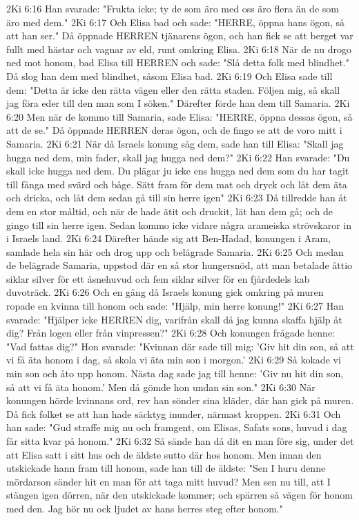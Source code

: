 2Ki 6:16  Han svarade: "Frukta icke; ty de som äro med oss äro flera än de som äro med dem."
2Ki 6:17  Och Elisa bad och sade: "HERRE, öppna hans ögon, så att han ser." Då öppnade HERREN tjänarens ögon, och han fick se att berget var fullt med hästar och vagnar av eld, runt omkring Elisa.
2Ki 6:18  När de nu drogo ned mot honom, bad Elisa till HERREN och sade: "Slå detta folk med blindhet." Då slog han dem med blindhet, såsom Elisa bad.
2Ki 6:19  Och Elisa sade till dem: "Detta är icke den rätta vägen eller den rätta staden. Följen mig, så skall jag föra eder till den man som I söken." Därefter förde han dem till Samaria.
2Ki 6:20  Men när de kommo till Samaria, sade Elisa: "HERRE, öppna dessas ögon, så att de se." Då öppnade HERREN deras ögon, och de fingo se att de voro mitt i Samaria.
2Ki 6:21  När då Israels konung såg dem, sade han till Elisa: "Skall jag hugga ned dem, min fader, skall jag hugga ned dem?"
2Ki 6:22  Han svarade: "Du skall icke hugga ned dem. Du plägar ju icke ens hugga ned dem som du har tagit till fånga med svärd och båge. Sätt fram för dem mat och dryck och låt dem äta och dricka, och låt dem sedan gå till sin herre igen"
2Ki 6:23  Då tillredde han åt dem en stor måltid, och när de hade ätit och druckit, lät han dem gå; och de gingo till sin herre igen. Sedan kommo icke vidare några arameiska strövskaror in i Israels land.
2Ki 6:24  Därefter hände sig att Ben-Hadad, konungen i Aram, samlade hela sin här och drog upp och belägrade Samaria.
2Ki 6:25  Och medan de belägrade Samaria, uppstod där en så stor hungersnöd, att man betalade åttio siklar silver för ett åsnehuvud och fem siklar silver för en fjärdedels kab duvoträck.
2Ki 6:26  Och en gång då Israels konung gick omkring på muren ropade en kvinna till honom och sade: "Hjälp, min herre konung!"
2Ki 6:27  Han svarade: "Hjälper icke HERREN dig, varifrån skall då jag kunna skaffa hjälp åt dig? Från logen eller från vinpressen?"
2Ki 6:28  Och konungen frågade henne: "Vad fattas dig?" Hon svarade: "Kvinnan där sade till mig: 'Giv hit din son, så att vi få äta honom i dag, så skola vi äta min son i morgon.'
2Ki 6:29  Så kokade vi min son och åto upp honom. Nästa dag sade jag till henne: 'Giv nu hit din son, så att vi få äta honom.' Men då gömde hon undan sin son."
2Ki 6:30  När konungen hörde kvinnans ord, rev han sönder sina kläder, där han gick på muren. Då fick folket se att han hade säcktyg inunder, närmast kroppen.
2Ki 6:31  Och han sade: "Gud straffe mig nu och framgent, om Elisas, Safats sons, huvud i dag får sitta kvar på honom."
2Ki 6:32  Så sände han då dit en man före sig, under det att Elisa satt i sitt hus och de äldste sutto där hos honom. Men innan den utskickade hann fram till honom, sade han till de äldste: "Sen I huru denne mördarson sänder hit en man för att taga mitt huvud? Men sen nu till, att I stängen igen dörren, när den utskickade kommer; och spärren så vägen för honom med den. Jag hör nu ock ljudet av hans herres steg efter honom."
